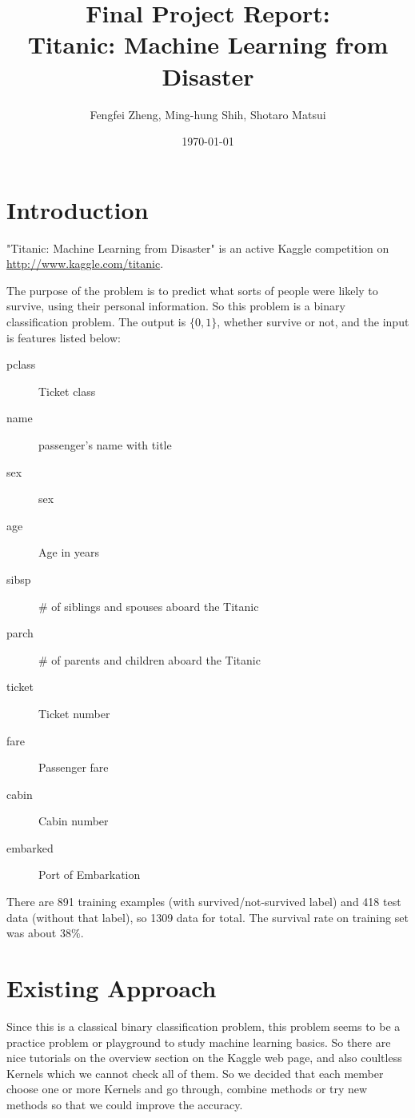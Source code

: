 \documentclass{article}
\title{Final Project Report:\\Titanic: Machine Learning from Disaster}
\author{Fengfei Zheng, Ming-hung Shih, Shotaro Matsui}
\date{\today}
\begin{document}
\maketitle

\section{Introduction}
"Titanic: Machine Learning from Disaster" is an active Kaggle competition on
\url{http://www.kaggle.com/titanic}.

The purpose of the problem is to predict what sorts of people were likely to survive, using their personal information.
So this problem is a binary classification problem.
The output is $\{0,1\}$, whether survive or not, and the input is features listed below:
\begin{description}
    \item[pclass] Ticket class
    \item[name] passenger's name with title
    \item[sex] sex
    \item[age] Age in years
    \item[sibsp] \# of siblings and spouses aboard the Titanic
    \item[parch] \# of parents and children aboard the Titanic
    \item[ticket] Ticket number
    \item[fare] Passenger fare
    \item[cabin] Cabin number
    \item[embarked] Port of Embarkation
\end{description}
There are 891 training examples (with survived/not-survived label) and 418 test data (without that label), so 1309 data for total.
The survival rate on training set was about $38\%$.




\section{Existing Approach}
Since this is a classical binary classification problem, this problem seems to be a practice problem or playground to study machine learning basics.
So there are nice tutorials on the overview section on the Kaggle web page, and also coultless Kernels which we cannot check all of them.
So we decided that each member choose one or more Kernels and go through, combine methods or try new methods so that we could improve the accuracy.
\end{document}
